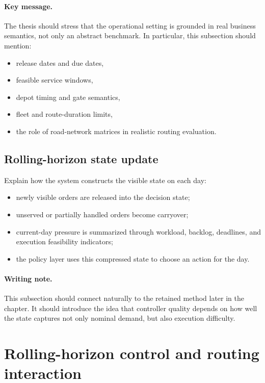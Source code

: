 \paragraph{Key message.}
The thesis should stress that the operational setting is grounded in real business semantics, not only an abstract benchmark. In particular, this subsection should mention:
\begin{itemize}
    \item release dates and due dates,
    \item feasible service windows,
    \item depot timing and gate semantics,
    \item fleet and route-duration limits,
    \item the role of road-network matrices in realistic routing evaluation.
\end{itemize}

\subsection{Rolling-horizon state update}
\label{subsec:arch_state_update}

Explain how the system constructs the visible state on each day:
\begin{itemize}
    \item newly visible orders are released into the decision state;
    \item unserved or partially handled orders become carryover;
    \item current-day pressure is summarized through workload, backlog, deadlines, and execution feasibility indicators;
    \item the policy layer uses this compressed state to choose an action for the day.
\end{itemize}

\paragraph{Writing note.}
This subsection should connect naturally to the retained method later in the chapter. It should introduce the idea that controller quality depends on how well the state captures not only nominal demand, but also execution difficulty.

\section{Rolling-horizon control and routing interaction}
\label{sec:arch_control_routing_interaction}

